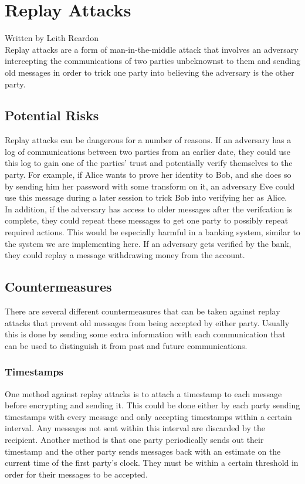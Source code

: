 \section{Replay Attacks}\label{sec:replayattacks}
Written by Leith Reardon\\

	\medskip
	Replay attacks are a form of man-in-the-middle attack that involves an adversary intercepting the communications of two parties unbeknownst to them and sending old messages in order to trick one party into believing the adversary is the other party. 
	
	\subsection{Potential Risks}\label{sec:replayrisks}
		Replay attacks can be dangerous for a number of reasons. If an adversary has a log of communications between two parties from an earlier date, they could use this log to gain one of the parties' trust and potentially verify themselves to the party. For example, if Alice wants to prove her identity to Bob, and she does so by sending him her password with some transform on it, an adversary Eve could use this message during a later session to trick Bob into verifying her as Alice. \\

		In addition, if the adversary has access to older messages after the verifcation is complete, they could repeat these messages to get one party to possibly repeat required actions. This would be especially harmful in a banking system, similar to the system we are implementing here. If an adversary gets verified by the bank, they could replay a message withdrawing money from the account. 
	
	\subsection{Countermeasures}\label{sec:replaycountermeasures}
		There are several different countermeasures that can be taken against replay attacks that prevent old messages from being accepted by either party. Usually this is done by sending some extra information with each communication that can be used to distinguish it from past and future communications. 
		
		\subsubsection{Timestamps}\label{sec:replaytimestamps}
			One method against replay attacks is to attach a timestamp to each message before encrypting and sending it. This could be done either by each party sending timestamps with every message and only accepting timestamps within a certain interval. Any messages not sent within this interval are discarded by the recipient. Another method is that one party periodically sends out their timestamp and the other party sends messages back with an estimate on the current time of the first party's clock. They must be within a certain threshold in order for their messages to be accepted.\\


